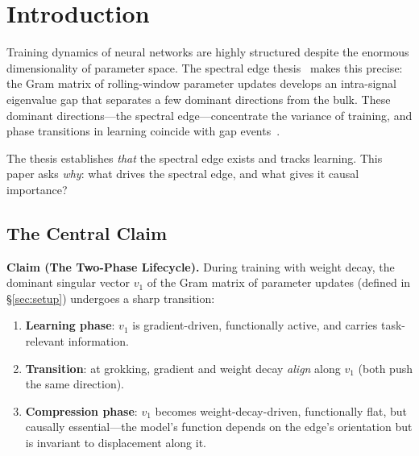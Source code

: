 \documentclass[11pt]{article}
\begin{document}
\section{Introduction}
\label{sec:intro}

Training dynamics of neural networks are highly structured despite the enormous dimensionality of parameter space.
The spectral edge thesis~\citep{xu2026spectral_edge} makes this precise: the Gram matrix of rolling-window parameter updates develops an intra-signal eigenvalue gap that separates a few dominant directions from the bulk.
These dominant directions---the spectral edge---concentrate the variance of training, and phase transitions in learning coincide with gap events~\citep{xu2026functional_modes, xu2026lowdim, xu2026commutator}.

The thesis establishes \emph{that} the spectral edge exists and tracks learning.
This paper asks \emph{why}: what drives the spectral edge, and what gives it causal importance?

\subsection{The Central Claim}

\begin{tcolorbox}[colback=blue!3, colframe=blue!40, boxrule=0.5pt, arc=2pt]
\textbf{Claim (The Two-Phase Lifecycle).}
During training with weight decay, the dominant singular vector $v_1$ of the Gram matrix of parameter updates (defined in \S\ref{sec:setup}) undergoes a sharp transition:
\begin{enumerate}[nosep]
    \item \textbf{Learning phase}: $v_1$ is gradient-driven, functionally active, and carries task-relevant information.
    \item \textbf{Transition}: at grokking, gradient and weight decay \emph{align} along $v_1$ (both push the same direction).
    \item \textbf{Compression phase}: $v_1$ becomes weight-decay-driven, functionally flat, but causally essential---the model's function depends on the edge's orientation but is invariant to displacement along it.
\end{enumerate}
\end{tcolorbox}
\end{document}
